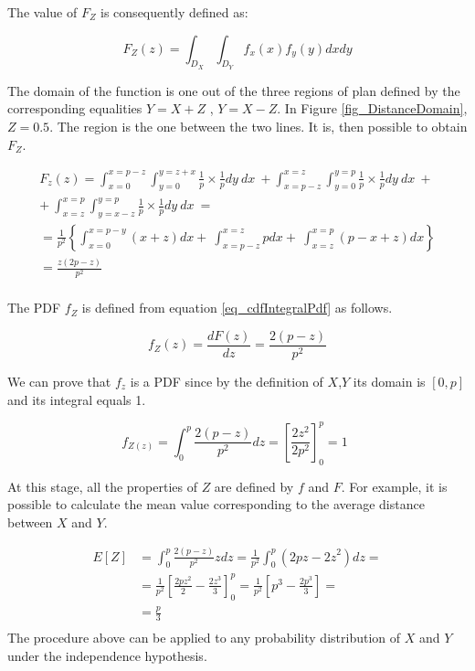 The value of $F_Z$ is consequently defined as:

\begin{equation}
F_Z(z)=\int_{D_X}\int_{D_Y}{f_x\left(x\right)f_y(y)dxdy}
\label{eq_Distance4}
\end{equation}

The domain of the function is one out of the three regions of plan defined by the corresponding equalities $Y=X+Z$ , $Y=X-Z$. In Figure \ref{fig_DistanceDomain}, $Z=0.5$. The region is the one between the two lines. It is, then possible to obtain $F_Z$. 
\begin{center}
\begin{equation}
    \label{eq_Distance5}
    \begin{split}
    F_z\left(z\right) =\int_{x=0}^{x=p-z}{\int_{y=0}^{y=z+x}{\frac{1}{p}\times\frac{1}{p}dy\ dx\ }}  + \int_{x=p-z}^{x=z}\int_{y=0}^{y=p}{\frac{1}{p}\times\frac{1}{p}dy\ dx\ }+ \\
    +\ \int_{x=z}^{x=p}{\int_{y=x-z}^{y=p}{\frac{1}{p}\times\frac{1}{p}dy\ dx\ }=} \\
    =\frac{1}{p^2}\left\{\int_{x=0}^{x=p-y}\left(x+z\right)dx+\ \int_{x=p-z}^{x=z}pdx+\ \int_{x=z}^{x=p}\left(p-x+z\right)dx\right\} \\
    =\frac{z\left(2p-z\right)}{p^2} \\
    \end{split}
\end{equation}
\end{center}


The PDF $f_Z$ is defined from equation \ref{eq_cdfIntegralPdf} as follows.

\begin{equation}
f_Z(z)=\frac{dF(z)}{dz}=\frac{2\left(p-z\right)}{p^2}
\label{eq_Distance6}
\end{equation}

We can prove that $f_z$ is a PDF since by the definition of $X$,$Y$ its domain is $[0,p]$ and its integral equals 1.

\begin{equation}
f_{Z\left(z\right)}=\int_{0}^{p}\frac{2\left(p-z\right)}{p^2}dz=\left[\frac{2z^2}{2p^2}\right]_0^p=1\ \ 
\label{eq_Distance7}
\end{equation}

At this stage, all the properties of $Z$ are defined by $f$ and $F$. For example, it is possible to calculate the mean value corresponding to the average distance between $X$ and $Y$. 

\begin{equation}
    \label{eq_Distance8}
    \begin{split}
    E\left[Z\right] & =\int_{0}^{p}\frac{2\left(p-z\right)}{p^2}zdz=\frac{1}{p^2}\int_{0}^{p}\left(2pz-{2z}^2\right)dz= \\
    & =\frac{1}{p^2}\left[\frac{2pz^2}{2}-\frac{{2z}^3}{3}\right]_0^p=\frac{1}{p^2}\left[p^3-\frac{2p^3}{3}\right]= \\
    & = \frac{p}{3} \\
    \end{split}
\end{equation}
The procedure above can be applied to any probability distribution of $X$ and $Y$ under the independence hypothesis.


